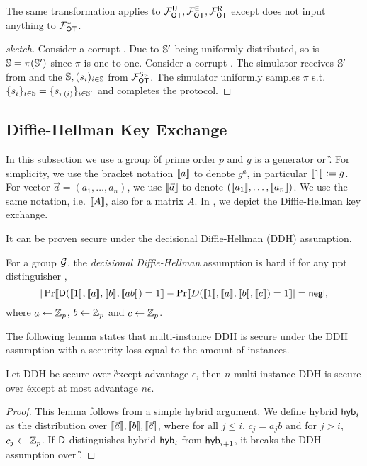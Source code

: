 \begin{remark}
	The same transformation applies to $\mathcal{F}_{\mathsf{OT}}^\mathsf{U},\mathcal{F}_{\mathsf{OT}}^\mathsf{E}, \mathcal{F}_{\mathsf{OT}}^\mathsf{R}$ except \send does not input anything to $\mathcal{F}_{\mathsf{OT}}^*$.
\end{remark}
 

\begin{proof}[sketch]
	Consider a corrupt \send. Due to $\mathsf{\mathbb S}'$ being uniformly distributed, so is $\mathsf{\mathbb S}=\pi(\mathsf{\mathbb S}')$ since $\pi$ is one to one. Consider a corrupt \rec. The simulator receives $\mathsf{\mathbb S}'$ from \rec and the $\mathsf{\mathbb S},(s_i)_{i\in\mathsf{\mathbb S}}$ from $\mathcal{F}_{\mathsf{OT}}^{\mathsf{S} u}$. The simulator uniformly samples $\pi$ s.t. $\{s_i\}_{i\in\mathsf{\mathbb S}} =\{s_{\pi(i)}\}_{i\in\mathsf{\mathbb S}'}$ and completes the protocol.
	\pe
\end{proof}


\subsection{Diffie-Hellman Key Exchange}\label{sec:DDH}
In this subsection we use a group \G of prime order $p$ and $g$ is a generator or \G. For simplicity, we use the bracket notation $\llbracket a\rrbracket$ to denote $g^a$, in particular $\llbracket 1\rrbracket:=g$. For vector $\vec{a}=(a_1,\ldots,a_n)$, we use $\llbracket \vec{a}\rrbracket$ to denote $(\llbracket a_1\rrbracket,\ldots,\llbracket a_n\rrbracket)$. We use the same notation, i.e. $\llbracket A\rrbracket$, also for a matrix $A$.
In , we depict the Diffie-Hellman key exchange. 

It can be proven secure under the decisional Diffie-Hellman (DDH) assumption.
\begin{definition}
For a group $\mathcal{G}$, the \emph{decisional Diffie-Hellman} assumption is hard if for any ppt distinguisher \D,
$$
|\Pr\llbracket \mathsf D(\llbracket 1\rrbracket,\llbracket a\rrbracket,\llbracket b\rrbracket,\llbracket ab\rrbracket)=1\rrbracket-\Pr\llbracket D(\llbracket 1\rrbracket,\llbracket a\rrbracket,\llbracket b\rrbracket,\llbracket c\rrbracket)=1\rrbracket|=\mathsf{negl},
$$
where $a\leftarrow\mathbb Z_p$, $b\leftarrow\mathbb Z_p$ and $c\leftarrow\mathbb Z_p$.
\end{definition}

The following lemma states that multi-instance DDH is secure under the DDH assumption with a security loss equal to the amount of instances.

\begin{lemma}\label{lem:DHuniform}
Let DDH be secure over \G except advantage $\epsilon$, then $n$ multi-instance DDH is secure over \G except at most advantage $n\epsilon$.
\end{lemma}

\begin{proof}
This lemma follows from a simple hybrid argument. We define hybrid $\mathsf{hyb}_i$ as the distribution over $\llbracket \vec{a}\rrbracket,\llbracket b\rrbracket,\llbracket \vec{c}\rrbracket$, where for all $j\leq i$, $c_j=a_jb$ and for $j>i$, $c_j\leftarrow\mathbb Z_p$. If $\mathsf D$ distinguishes hybrid $\mathsf{hyb}_i$ from $\mathsf{hyb}_{i+1}$, it breaks the DDH assumption over \G.
\pe
\end{proof}

